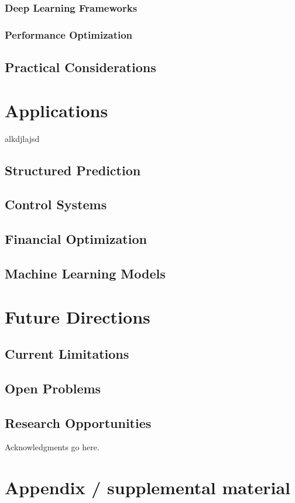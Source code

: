 \documentclass{article}
\begin{document}
    \subsubsection{Deep Learning Frameworks}
    \subsubsection{Performance Optimization}
\subsection{Practical Considerations}

\section{Applications}

alkdjlajsd
\subsection{Structured Prediction}
\subsection{Control Systems}
\subsection{Financial Optimization}
\subsection{Machine Learning Models}

\section{Future Directions}
\subsection{Current Limitations}
\subsection{Open Problems}
\subsection{Research Opportunities}

\begin{ack}
Acknowledgments go here.
\end{ack}

\small





\appendix

\section{Appendix / supplemental material}


\newpage
\end{document}
